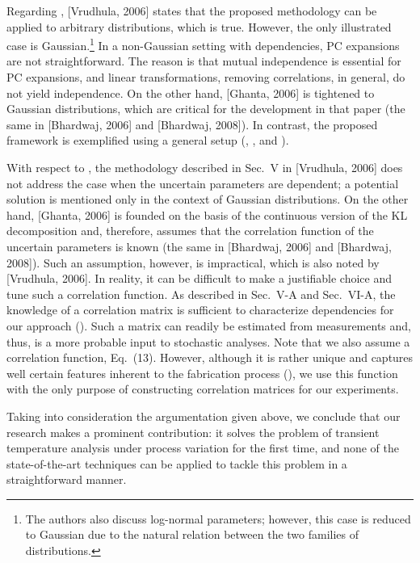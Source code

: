 \begin{authors}
Regarding , [Vrudhula, 2006] states that the proposed methodology can be applied to arbitrary distributions, which is true.
However, the only illustrated case is Gaussian.\footnote{The authors also discuss log-normal parameters; however, this case is reduced to Gaussian due to the natural relation between the two families of distributions.}
In a non-Gaussian setting with dependencies, PC expansions are not straightforward.
The reason is that mutual independence is essential for PC expansions, and linear transformations, removing correlations, in general, do not yield independence.
On the other hand, [Ghanta, 2006] is tightened to Gaussian distributions, which are critical for the development in that paper (the same in [Bhardwaj, 2006] and [Bhardwaj, 2008]).
In contrast, the proposed framework is exemplified using a general setup (, , and ).

With respect to , the methodology described in Sec.~V in [Vrudhula, 2006] does not address the case when the uncertain parameters are dependent; a potential solution is mentioned only in the context of Gaussian distributions.
On the other hand, [Ghanta, 2006] is founded on the basis of the continuous version of the KL decomposition and, therefore, assumes that the correlation function of the uncertain parameters is known (the same in [Bhardwaj, 2006] and [Bhardwaj, 2008]).
Such an assumption, however, is impractical, which is also noted by [Vrudhula, 2006].
In reality, it can be difficult to make a justifiable choice and tune such a correlation function.
As described in Sec.~V-A and Sec.~VI-A, the knowledge of a correlation matrix is sufficient to characterize dependencies for our approach ().
Such a matrix can readily be estimated from measurements and, thus, is a more probable input to stochastic analyses.
Note that we also assume a correlation function, Eq.~(13).
However, although it is rather unique and captures well certain features inherent to the fabrication process (), we use this function with the only purpose of constructing correlation matrices for our experiments.

Taking into consideration the argumentation given above, we conclude that our research makes a prominent contribution: it solves the problem of transient temperature analysis under process variation for the first time, and none of the state-of-the-art techniques can be applied to tackle this problem in a straightforward manner.

\begin{actions}
\end{actions}
\end{authors}

